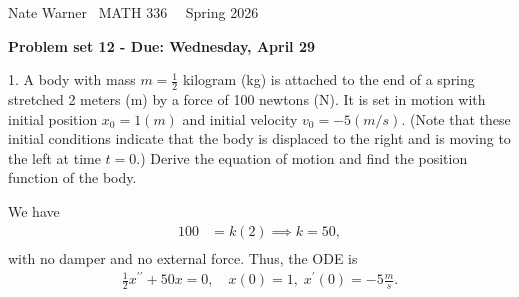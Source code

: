 \documentclass{report}
\title{\Huge{}}
\author{\huge{Nathan Warner}}
\date{\huge{}}
\begin{document}
    \pagebreak \bigbreak \noindent
    Nate Warner \ \quad \quad \quad \quad \quad \quad \quad \quad \quad \quad \quad \quad  MATH 336 \quad  \quad \quad \quad \quad \quad \quad \quad \quad \ \ \quad \quad Spring 2026
    \begin{center}
        \textbf{Problem set 12 - Due: Wednesday, April 29 }
    \end{center}
    \bigbreak \noindent 
    \begin{mdframed}
        1. A body with mass $m = \frac{1}{2}$ kilogram (kg) is attached to the end of a spring stretched 2 meters (m) by a force of 100 newtons (N). It is set in motion with initial position $x_{0} = 1(m)$ and initial velocity $v_{0} = −5(m/s)$. (Note that these initial conditions indicate that the body is displaced to the right and is moving to the left at time $t = 0$.) Derive the equation of motion and find the position function of the body.
    \end{mdframed}
    \bigbreak \noindent 
    We have
    \begin{align*}
        100 &= k(2) \implies k = 50, \\
    \end{align*}
    with no damper and no external force. Thus, the ODE is 
    \begin{align*}
        \frac{1}{2}x^{\prime\prime} + 50x = 0,\quad x(0) = 1,\; x^{\prime}(0) = -5 \frac{m}{s}
    .\end{align*}
\end{document}
